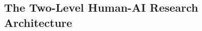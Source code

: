\documentclass{article}
\begin{document}
\subsection{The Two-Level Human-AI Research Architecture}
\label{sec:meth-levels}

%
%
%
%
%
\end{document}
